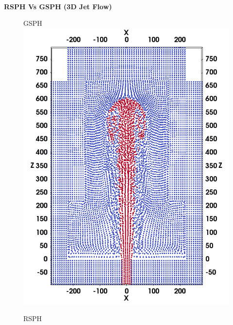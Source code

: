 \documentclass[oneside,11pt]{memoir}
\begin{document}
\begin{vplace}[0.7]
\centering
\textbf{RSPH Vs GSPH (3D Jet Flow)}
\begin{figure}[htp]
    \centering
    \begin{minipage}[b][][b]{.325 \textwidth}
        \centering GSPH
        \includegraphics[width=0.99 \textwidth]{./Figures/GSPH-HLLC-t3-cutView}
    \end{minipage}%
    \begin{minipage}[b][][b]{.325\textwidth}
        \centering RSPH

\end{minipage}
\end{figure}
\end{vplace}
\end{document}

